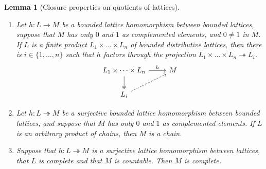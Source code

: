 \documentclass[12pt]{amsart}
\theoremstyle{plain}
\newtheorem{lemma}[theorem]{Lemma}
\theoremstyle{definition}
\begin{document}
\begin{lemma}[Closure properties on quotients of lattices]\label{lem: closure properties on quotients of lattices}
    \hfill
    \begin{enumerate}
        \item
        \label{i:quotient-of-finite-product}
        Let $h \colon L \to M$ be a bounded lattice homomorphism between bounded lattices, suppose that $M$ has only $0$ and $1$ as complemented elements, and $0 \neq 1$ in $M$.
        If $L$ is a finite product $L_1 \times \dots \times L_n$ of bounded distributive lattices,
        then there is $i \in \{1, \dots, n\}$ such that $h$ factors through the projection $L_1 \times \dots \times L_n \twoheadrightarrow L_{i}$.
        \[
        \begin{tikzcd}
            L_1 \times \dots \times L_n \arrow[two heads]{d}{} \arrow{r}{h}& M\\
            L_i \arrow[dashed]{ru}
        \end{tikzcd}
        \]
        

        \item \label{eq: quotient of product of chain} 
        Let $h \colon L \twoheadrightarrow M$ be a surjective bounded lattice homomorphism between bounded lattices, and suppose that $M$ has only $0$ and $1$ as complemented elements.
        If $L$ is an arbitrary product of chains, then $M$ is a chain.
        
        \item \label{eq: complete factor} Suppose that $h \colon L \twoheadrightarrow M$ is a surjective lattice homomorphism between lattices, that $L$ is complete and that $M$ is countable.
        Then $M$ is complete.

        
    \end{enumerate}
\end{lemma}
\end{document}
